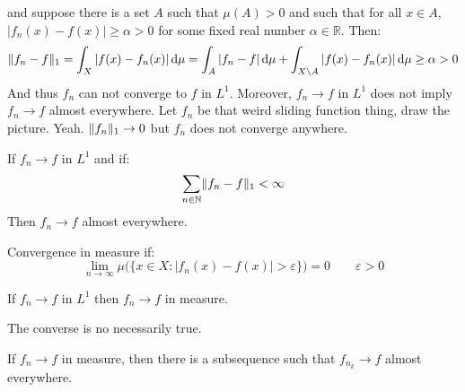 \documentclass[crop=false,class=article]{standalone}                           %
\begin{document}
        and suppose there is a set $A$ such that $\mu(A)>0$ and such that for
        all $x\in{A}$, $|f_{n}(x)-f(x)|\geq\alpha>0$ for some fixed real number
        $\alpha\in\mathbb{R}$. Then:
        \begin{equation}
            \lVert f_{n}-f\rVert_{1}=\int_{X}|f(x)-f_{n}(x)|\mathop{}\!\mathrm{d}\mu
            =\int_{A}|f_{n}-f|\mathop{}\!\mathrm{d}\mu
            +\int_{X\setminus{A}}|f(x)-f_{n}(x)|\mathop{}\!\mathrm{d}\mu
            \geq\alpha>0
        \end{equation}
        And thus $f_{n}$ can not converge to $f$ in $L^{1}$. Moreover,
        $f_{n}\rightarrow{f}$ in $L^{1}$ does not imply $f_{n}\rightarrow{f}$
        almost everywhere. Let $f_{n}$ be that weird sliding function thing,
        draw the picture. Yeah. $\lVert f_{n}\rVert_{1}\rightarrow{0}$ but $f_{n}$
        does not converge anywhere.
        \begin{theorem}
            If $f_{n}\rightarrow{f}$ in $L^{1}$ and if:
            \begin{equation}
                \sum_{n\in\mathbb{N}}\lVert f_{n}-f\rVert_{1}<\infty
            \end{equation}
            Then $f_{n}\rightarrow{f}$ almost everywhere.
        \end{theorem}
        Convergence in measure if:
        \begin{equation}
            \underset{n\rightarrow\infty}{\lim}
            \mu\Big(\big\{x\in{X}:|f_{n}(x)-f(x)|>\varepsilon\big\}\Big)=0
            \quad\quad
            \varepsilon>0
        \end{equation}
        \begin{theorem}
            If $f_{n}\rightarrow{f}$ in $L^{1}$ then $f_{n}\rightarrow{f}$ in
            measure.
        \end{theorem}
        The converse is no necessarily true.
        \begin{theorem}
            If $f_{n}\rightarrow{f}$ in measure, then there is a subsequence
            such that $f_{n_{k}}\rightarrow{f}$ almost everywhere.
        \end{theorem}
\end{document}
